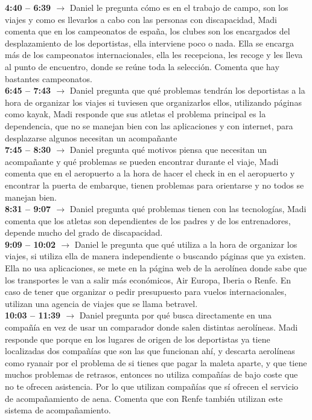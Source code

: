 \textbf{4:40 -- 6:39 $\rightarrow$} Daniel le pregunta cómo es en el trabajo de campo, son los viajes y como es llevarlos a cabo con las personas con discapacidad, Madi comenta que en los campeonatos de españa, los clubes son los encargados del desplazamiento de los deportistas, ella interviene poco o nada. Ella se encarga más de los campeonatos internacionales, ella les recepciona, les recoge y les lleva al punto de encuentro, donde se reúne toda la selección. Comenta que hay bastantes campeonatos. \\
\textbf{6:45 -- 7:43 $\rightarrow$} Daniel pregunta que qué problemas tendrán los deportistas a la hora de organizar los viajes si tuviesen que organizarlos ellos, utilizando páginas como kayak, Madi responde que sus atletas el problema principal es la dependencia, que no se manejan bien con las aplicaciones y con internet, para desplazarse algunos necesitan un acompañante \\
\textbf{7:45 -- 8:30 $\rightarrow$} Daniel pregunta qué motivos piensa que necesitan un acompañante y qué problemas se pueden encontrar durante el viaje, Madi comenta que en el aeropuerto a la hora de hacer el check in en el aeropuerto y encontrar la puerta de embarque, tienen problemas para orientarse y no todos se manejan bien. \\
\textbf{8:31 -- 9:07 $\rightarrow$} Daniel pregunta qué problemas tienen con las tecnologías, Madi comenta que los atletas son dependientes de los padres y de los entrenadores, depende mucho del grado de discapacidad. \\
\textbf{9:09 -- 10:02 $\rightarrow$} Daniel le pregunta que qué utiliza a la hora de organizar los viajes, si utiliza ella de manera independiente o buscando páginas que ya existen. Ella no usa aplicaciones, se mete en la página web de la aerolínea donde sabe que los transportes le van a salir más económicos, Air Europa, Iberia o Renfe. En caso de tener que organizar o pedir presupuesto para vuelos internacionales, utilizan una agencia de viajes que se llama betravel. \\
\textbf{10:03 -- 11:39 $\rightarrow$} Daniel pregunta por qué busca directamente en una compañía en vez de usar un comparador donde salen distintas aerolíneas. Madi responde que porque en los lugares de origen de los deportistas ya tiene localizadas dos compañías que son las que funcionan ahí, y descarta aerolíneas como ryanair por el problema de si tienes que pagar la maleta aparte, y que tiene muchos problemas de retrasos, entonces no utiliza compañías de bajo coste que no te ofrecen asistencia.  Por lo que utilizan compañías que sí ofrecen el servicio de acompañamiento de aena. Comenta que con Renfe también utilizan este sistema de acompañamiento. \\
